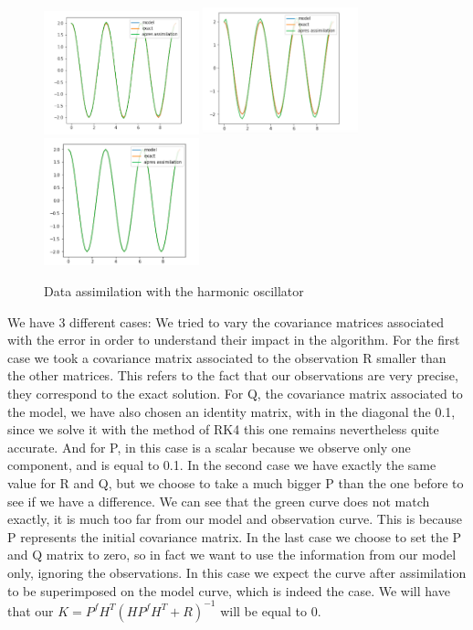 \begin{figure}[H]
    \centering
		\includegraphics[width=0.4\textwidth]{"images/enkf/oscillator1.png"}
		\includegraphics[width=0.4\textwidth]{"images/enkf/oscillator2.png"}
		\includegraphics[width=0.4\textwidth]{"images/enkf/oscillator3.png"}
		\caption{Data assimilation with the harmonic oscillator}
\end{figure}
\noindent We have 3 different cases:
We tried to vary the covariance matrices associated with the error in order to understand their impact in the algorithm. For the first case we took a covariance matrix associated to the observation R smaller than the other matrices. This refers to the fact that our observations are very precise, they correspond to the exact solution. For Q, the covariance matrix associated to the model, we have also chosen an identity matrix, with in the diagonal the 0.1, since we solve it with the method of RK4 this one remains nevertheless quite accurate. And for P, in this case is a scalar because we observe only one component, and is equal to 0.1.
In the second case we have exactly the same value for R and Q, but we choose to take a  much bigger P than the one before to see if we have a difference. We can see that the green curve does not match exactly, it is much too far from our model and observation curve. This is because P represents the initial covariance matrix.
In the last case we choose to set the P and Q matrix to zero, so in fact we want to use the information from our model only, ignoring the observations. In this case we expect the curve after assimilation to be superimposed on the model curve, which is indeed the case. We will have that our $K=P^fH^T(HP^fH^T+R)^{-1}$ will be equal to 0.
